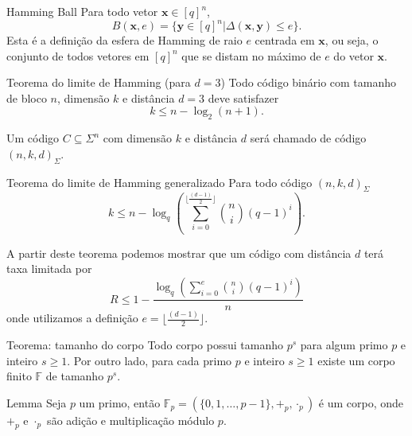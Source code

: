 \begin{frame}[allowframebreaks]
  \framebreak

  \begin{block}{Hamming Ball}
    Para todo vetor $\mathbf{x} \in [q]^n$,
    \begin{equation}
      B(\mathbf{x},e) = \{\mathbf{y} \in [q]^n | \Delta(\mathbf{x},\mathbf{y}) \leq e \}.
    \end{equation}
    Esta é a definição da esfera de Hamming de raio $e$ centrada em $\mathbf{x}$, ou seja, o conjunto de todos
    vetores em $[q]^n$ que se distam no máximo de $e$ do vetor $\mathbf{x}$.
  \end{block}
  
  \begin{block}{Teorema do limite de Hamming (para $d=3$)}
    Todo código binário com tamanho de bloco $n$, dimensão $k$ e distância $d=3$ deve satisfazer
    \begin{equation}
      k \leq n - \log_2 (n+1) .
    \end{equation}
  \end{block}
  
  \framebreak
  Um código $C \subseteq \Sigma^n$ com dimensão $k$ e distância $d$ será chamado de código $(n,k,d)_{\Sigma}$.
  \begin{block}{Teorema do limite de Hamming generalizado}
    Para todo código $(n,k,d)_{\Sigma}$
    \begin{equation}
      k \leq n - \log_q \left( \sum_{i=0}^{\lfloor \frac{(d-1)}{2} \rfloor} {n \choose i} (q-1)^i \right).
    \end{equation}
  \end{block}
  A partir deste teorema podemos mostrar que um código com distância $d$ terá taxa limitada por
  \begin{equation}
    R \leq 1 - \frac{\log_q \left( \sum_{i=0}^{e} {n \choose i} (q-1)^i \right)}{n}
  \end{equation}
  onde utilizamos a definição $e = \lfloor \frac{(d-1)}{2} \rfloor$.
  
  \begin{block}{Teorema: tamanho do corpo}
    Todo corpo possui tamanho $p^s$ para algum primo $p$ e inteiro $s \geq 1$.
    Por outro lado, para cada primo $p$ e inteiro $s \geq 1$ existe um corpo finito $\mathbb{F}$ de tamanho $p^s$.
  \end{block}

  \begin{block}{Lemma}
    Seja $p$ um primo, então $\mathbb{F}_p = (\{0,1,\ldots,p-1\}, +_p, \cdot_p)$ é um corpo, onde $+_p$ e $\cdot_p$ são
    adição e multiplicação módulo $p$.
  \end{block}


\end{frame}
